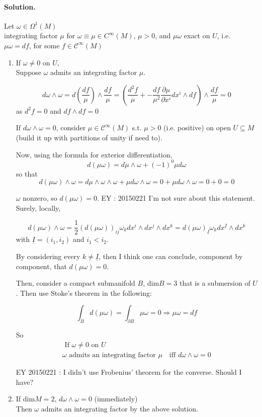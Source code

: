 \paragraph{Solution.}

Let $\omega \in \Omega^1(M)$ \\
integrating factor $\mu $ for $\omega \equiv \mu \in C^{\infty}(M)$, $\mu > 0$, and $\mu \omega $ exact on $U$, i.e. $\mu \omega = df$, for some $f \in \mathcal{C}^{\infty}(M)$

\begin{enumerate}
\item[(a)] If $\omega \neq 0$ on $U$, \\
Suppose $\omega$ admits an integrating factor $\mu$.  

\[
d\omega \wedge \omega = d\left( \frac{df}{\mu} \right) \wedge \frac{df}{\mu} = \left( \frac{d^2 f}{ \mu} + -\frac{df}{\mu^2} \frac{ \partial \mu }{ \partial x^i } dx^i \wedge df \right) \wedge \frac{df}{\mu} = 0 
\]
as $d^2f =0$ and $df\wedge df =0$

If $d\omega \wedge \omega =0$, consider $\mu \in \mathcal{C}^{\infty}(M)$ s.t. $\mu >0$ (i.e. positive) on open $U\subseteq M$ (build it up with partitions of unity if need to).  

Now, using the formula for exterior differentiation, 
\[
d(\mu \omega) = d\mu \wedge \omega + (-1)^0 \mu d\omega 
\]
so that 
\[
d (\mu \omega) \wedge \omega = d\mu \wedge \omega \wedge \omega + \mu d\omega \wedge \omega = 0 + \mu d\omega \wedge \omega = 0 + 0 = 0 
\]

$\omega$ nonzero, so $d(\mu \omega) =0$.  EY : 20150221 I'm not sure about this statement. Surely, locally,

\[
d(\mu \omega) \wedge \omega = \frac{1}{2} ( d(\mu \omega) )_{ij} \omega_k dx^i \wedge dx^j \wedge dx^k = d(\mu \omega)_{ \underline{I}} \omega_k dx^{\underline{I}} \wedge dx^k
\]
with $\underline{I} = (i_1,i_2)$ and $i_1 < i_2$.  

By considering every $k \neq \underline{I}$, then I think one can conclude, component by component, that $d(\mu \omega) =0$. 

Then, consider a compact submanifold $B$, $\text{dim}{B} =3$ that is a submersion of $U$.  Then use Stoke's theorem in the following:

\[
\int_B d(\mu \omega) = \int_{\partial B} \mu \omega = 0 \Longrightarrow \mu \omega = df
\]

So 
\[
\boxed{ \begin{gathered} \text{ If } \omega \neq 0 \text{ on } U \\
    \omega \text{ admits an integrating factor $\mu$ } \text{ iff } d\omega \wedge \omega  =0  \end{gathered} }
\]

EY 20150221 : I didn't use Frobenius' theorem for the converse.  Should I have?
\item[(b)] If $\text{dim}{M}=2$, $d\omega \wedge \omega =0$ (immediately) \\
Then $\omega $ admits an integrating factor by the above solution.
\end{enumerate}
